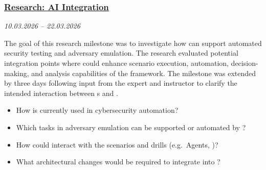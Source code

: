 \subsubsection{\href{https://gitlab.ti.bfh.ch/groups/gausf1-vonal3/-/milestones/19}{Research: AI Integration}}\label{subsubsec:milestone-research-ai-integration}
\textit{10.03.2026 -- 22.03.2026}

The goal of this research milestone was to investigate how  can support automated security testing and adversary emulation.
The research evaluated potential integration points where  could enhance scenario execution, automation, decision-making, and analysis capabilities of the  framework.
The milestone was extended by three days following input from the expert and instructor to clarify the intended interaction between s and .

\begin{itemize}
    \item[$\checkmark$] How is  currently used in cybersecurity automation?
    \item[$\checkmark$] Which tasks in adversary emulation can be supported or automated by ?
    \item[$\checkmark$] How could  interact with the  scenarios and drills (e.g.\ Agents, )?
    \item[$\checkmark$] What architectural changes would be required to integrate  into ?
\end{itemize}
